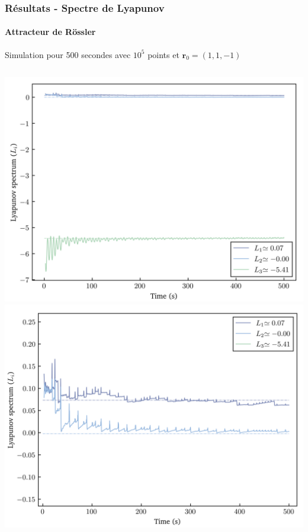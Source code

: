 \begin{frame}
    \frametitle{Résultats - Spectre de Lyapunov}
    \framesubtitle{Attracteur de Rössler}
    Simulation pour 500 secondes avec $10^5$ points et $\bm{r}_0 = (1, 1, -1)$
    \vspace{1cm}
    \begin{columns}
        \centering
        \includegraphics[scale=0.4]{figures/lyapunovs/lyap_rossler.png}
        \includegraphics[scale=0.4]{figures/lyapunovs/lyap_rossler_zoom.png}
    \end{columns}
\end{frame}

